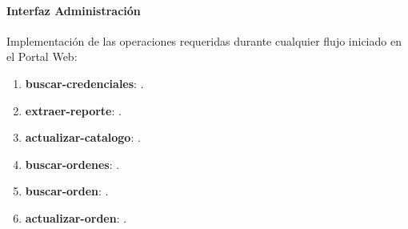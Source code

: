 \paragraph{\indent Interfaz Administración\\}
Implementación de las operaciones requeridas durante cualquier flujo iniciado en el Portal Web:
\begin{enumerate}
	\item \textbf{buscar-credenciales}: .
	\item \textbf{extraer-reporte}: .
	\item \textbf{actualizar-catalogo}: .
	\item \textbf{buscar-ordenes}: .
	\item \textbf{buscar-orden}: .
	\item \textbf{actualizar-orden}: .
\end{enumerate}

